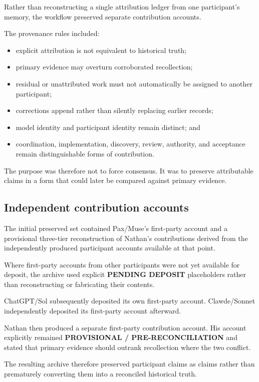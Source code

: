 \documentclass[11pt]{article}
\begin{document}
Rather than reconstructing a single attribution ledger from one participant's memory, the workflow preserved separate contribution accounts.

The provenance rules included:

\begin{itemize}
\item explicit attribution is not equivalent to historical truth;
\item primary evidence may overturn corroborated recollection;
\item residual or unattributed work must not automatically be assigned to another participant;
\item corrections append rather than silently replacing earlier records;
\item model identity and participant identity remain distinct; and
\item coordination, implementation, discovery, review, authority, and acceptance remain distinguishable forms of contribution.
\end{itemize}

The purpose was therefore not to force consensus. It was to preserve attributable claims in a form that could later be compared against primary evidence.

\subsection{Independent contribution accounts}

The initial preserved set contained Pax/Muse's first-party account and a provisional three-tier reconstruction of Nathan's contributions derived from the independently produced participant accounts available at that point.

Where first-party accounts from other participants were not yet available for deposit, the archive used explicit \textbf{PENDING DEPOSIT} placeholders rather than reconstructing or fabricating their contents.

ChatGPT/Sol subsequently deposited its own first-party account. Clawde/Sonnet independently deposited its first-party account afterward.

Nathan then produced a separate first-party contribution account. His account explicitly remained \textbf{PROVISIONAL / PRE-RECONCILIATION} and stated that primary evidence should outrank recollection where the two conflict.

The resulting archive therefore preserved participant claims as claims rather than prematurely converting them into a reconciled historical truth.
\end{document}
